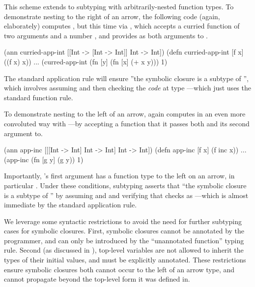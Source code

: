 This scheme extends to subtyping with arbitrarily-nested function types.
To demonstrate nesting to the right of an arrow,
the following code (again, elaborately) computes ,
but this time
via , which accepts a curried
function of two arguments  and a number , and 
provides  as both arguments to .

\begin{cljlisting}
(ann curried-app-int [[Int -> [Int -> Int]] Int -> Int])
(defn curried-app-int [f x] ((f x) x))
...
(curred-app-int (fn [y] (fn [x] (+ x y))) 1)
\end{cljlisting}

The standard application rule will ensure 
''the symbolic closure 
is a subtype of
'', which involves assuming
 and then checking the \emph{code} 
at type ---which just uses the standard
function rule.

To demonstrate nesting to the left of an arrow,
 again computes 
in an even more convoluted way with ---by accepting a function
 that it passes both  and its second argument to.

\begin{cljlisting}
(ann app-inc [[[Int -> Int] Int -> Int] Int -> Int])
(defn app-inc [f x] (f inc x))
...
(app-inc (fn [g y] (g y)) 1)
\end{cljlisting}

Importantly, 's first argument has a function
type to the left on an arrow, in particular .
Under these conditions, subtyping asserts that ``the symbolic
closure  is a subtype of ''
by assuming  and  and
verifying that  checks as ---which is almost immediate by
the standard application rule.

We leverage some syntactic restrictions
to avoid the need for further subtyping cases for symbolic closures.
First, symbolic closures cannot be annotated by the programmer,
and can only be introduced by the ``unannotated function'' typing rule.
Second (as discussed in ),
top-level variables are not allowed to inherit the types of their initial
values, and must be explicitly annotated.
These restrictions ensure symbolic closures both cannot occur to the
left of an arrow type, and 
cannot propagate beyond the top-level form it was defined in.


